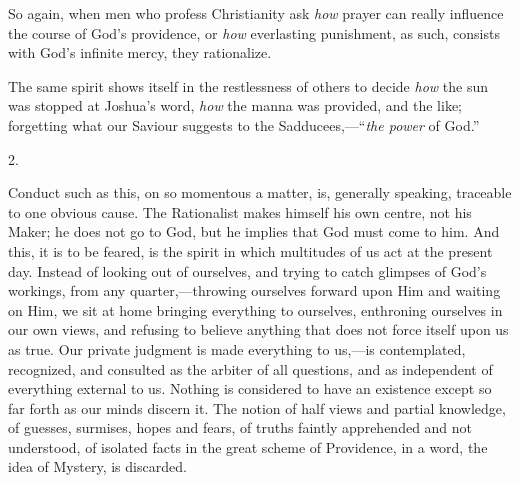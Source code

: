So again, when men who profess Christianity ask \emph{how}
prayer can really influence the course of God's providence, or \emph{how}
everlasting punishment, as such, consists with God's infinite mercy,
they rationalize.

The same spirit shows itself in the restlessness
of others to decide \emph{how} the sun was stopped at Joshua's word, \emph{how}
the manna was provided, and the like; forgetting what our Saviour
suggests to the Sadducees,—``\emph{the power} of God.''

2.

Conduct such as this, on so momentous a matter,
is, generally speaking, traceable to one obvious cause. The
Rationalist makes himself his own centre, not his Maker; he does
not go to God, but he implies that God must come to him. And this, it
is to be feared, is the spirit in which multitudes of us act at the
present day. Instead of looking out of ourselves, and trying to catch
glimpses of God's workings, from any quarter,—throwing ourselves
forward upon Him and waiting on Him, we sit at home bringing
everything to ourselves, enthroning ourselves in our own views, and
refusing to believe anything that does not force itself upon us as
true. Our private judgment is made everything to us,—is
contemplated, recognized, and consulted as the arbiter of all
questions, and as independent of everything external to us. Nothing is
considered to have an existence except so far forth as our minds
discern it. The notion of half views and partial knowledge, of
guesses, surmises, hopes and fears, of truths faintly apprehended and
not understood, of isolated facts in the great scheme of Providence,
in a word, the idea of Mystery, is discarded.

